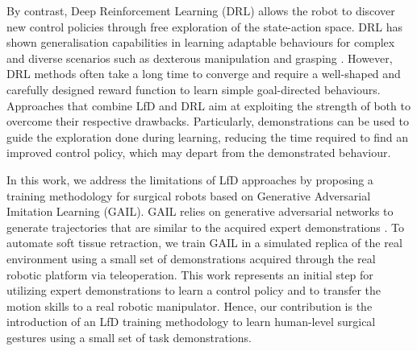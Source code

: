 \documentclass[letterpaper, 10 pt, conference]{ieeeconf}
\begin{document}
By contrast, Deep Reinforcement Learning (DRL) allows the robot to discover new control policies through free exploration of the state-action space. DRL has shown generalisation capabilities in learning adaptable behaviours for complex and diverse scenarios such as dexterous manipulation and grasping \cite{ibarz2021train}. However, DRL methods often take a long time to converge and require a well-shaped and carefully designed reward function to learn simple goal-directed behaviours. Approaches that combine LfD and DRL aim at exploiting the strength of both to overcome their respective drawbacks. Particularly, demonstrations can be used to guide the exploration done during learning, reducing the time required to find an improved control policy, which may depart from the demonstrated behaviour.



In this work, we address the limitations of LfD approaches by proposing a training methodology for surgical robots based on Generative Adversarial Imitation Learning (GAIL).
GAIL relies on generative adversarial networks to generate trajectories that are similar to the acquired expert demonstrations \cite{ho2016generative}.
To automate soft tissue retraction, we train GAIL in a simulated replica of the real environment using a small set of demonstrations acquired through the real robotic platform via teleoperation. This work represents an initial step for utilizing expert demonstrations to learn a control policy and to transfer the motion skills to a real robotic manipulator.
Hence, our contribution is the introduction of an LfD training methodology to learn human-level surgical gestures using a small set of task demonstrations.
\end{document}

